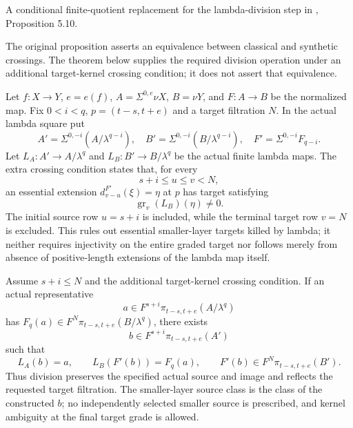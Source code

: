 \begin{theorem}
\label{sem:ProofTools:finite-lambda-division}
A conditional finite-quotient replacement for the lambda-division step in
\cite{LWX126}, Proposition 5.10.\par
The original proposition asserts an equivalence between classical and
synthetic crossings. The theorem below supplies the required division
operation under an additional target-kernel crossing condition; it does
not assert that equivalence.

Let $f:X\to Y$, $e=e(f)$, $A=\Sigma^{0,e}\nu X$, $B=\nu Y$, and $F:A\to B$ be the normalized map. Fix $0<i<q$, $p=(t-s,t+e)$ and a target filtration $N$. In the actual lambda square put
\[
A'=\Sigma^{0,-i}(A/\lambda^{q-i}),\quad
B'=\Sigma^{0,-i}(B/\lambda^{q-i}),\quad
F'=\Sigma^{0,-i}F_{q-i}.
\]
Let $L_A:A'\to A/\lambda^q$ and $L_B:B'\to B/\lambda^q$ be the actual finite lambda maps. The extra crossing condition states that, for every
\[s+i\le u\le v<N,\]
an essential extension $d_{v-u}^{F'}(\xi)=\eta$ at $p$ has target satisfying
\[\operatorname{gr}_v(L_B)(\eta)\ne0.\]
The initial source row $u=s+i$ is included, while the terminal target row $v=N$ is excluded. This rules out essential smaller-layer targets killed by lambda; it neither requires injectivity on the entire graded target nor follows merely from absence of positive-length extensions of the lambda map itself.

Assume $s+i\le N$ and the additional target-kernel crossing condition. If an actual representative
\[a\in F^{s+i}\pi_{t-s,t+e}(A/\lambda^q)\]
has $F_q(a)\in F^N\pi_{t-s,t+e}(B/\lambda^q)$, there exists
\[b\in F^{s+i}\pi_{t-s,t+e}(A')\]
such that
\[L_A(b)=a,\qquad L_B(F'(b))=F_q(a),\qquad F'(b)\in F^N\pi_{t-s,t+e}(B').\]
Thus division preserves the specified actual source and image and reflects the requested target filtration. The smaller-layer source class is the class of the constructed $b$; no independently selected smaller source is prescribed, and kernel ambiguity at the final target grade is allowed.
\end{theorem}

